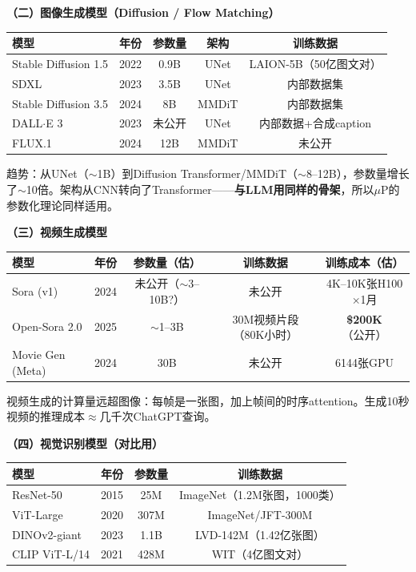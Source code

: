 \documentclass[11pt,a4paper]{article}
\begin{document}
\bigskip
\textbf{（二）图像生成模型（Diffusion / Flow Matching）}

\begin{center}
\renewcommand{\arraystretch}{1.3}
\begin{tabular}{llccc}
\toprule
模型 & 年份 & 参数量 & 架构 & 训练数据 \\
\midrule
Stable Diffusion 1.5 & 2022 & 0.9B & UNet & LAION-5B（50亿图文对）\\
SDXL & 2023 & 3.5B & UNet & 内部数据集 \\
Stable Diffusion 3.5 & 2024 & 8B & MMDiT & 内部数据集 \\
DALL$\cdot$E 3 & 2023 & 未公开 & UNet & 内部数据+合成caption \\
FLUX.1 & 2024 & 12B & MMDiT & 未公开 \\
\bottomrule
\end{tabular}
\end{center}

趋势：从UNet（$\sim$1B）到Diffusion Transformer/MMDiT（$\sim$8--12B），参数量增长了$\sim$10倍。架构从CNN转向了Transformer——\textbf{与LLM用同样的骨架}，所以$\mu$P的参数化理论同样适用。

\bigskip
\textbf{（三）视频生成模型}

\begin{center}
\renewcommand{\arraystretch}{1.3}
\begin{tabular}{llccc}
\toprule
模型 & 年份 & 参数量（估） & 训练数据 & 训练成本（估）\\
\midrule
Sora (v1) & 2024 & 未公开（$\sim$3--10B?） & 未公开 & 4K--10K张H100$\times$1月 \\
Open-Sora 2.0 & 2025 & $\sim$1--3B & 30M视频片段（80K小时） & \textbf{\$200K}（公开） \\
Movie Gen (Meta) & 2024 & 30B & 未公开 & 6144张GPU \\
\bottomrule
\end{tabular}
\end{center}

视频生成的计算量远超图像：每帧是一张图，加上帧间的时序attention。生成10秒视频的推理成本$\approx$几千次ChatGPT查询。

\bigskip
\textbf{（四）视觉识别模型（对比用）}

\begin{center}
\renewcommand{\arraystretch}{1.3}
\begin{tabular}{llcc}
\toprule
模型 & 年份 & 参数量 & 训练数据 \\
\midrule
ResNet-50 & 2015 & 25M & ImageNet（1.2M张图，1000类） \\
ViT-Large & 2020 & 307M & ImageNet/JFT-300M \\
DINOv2-giant & 2023 & 1.1B & LVD-142M（1.42亿张图）\\
CLIP ViT-L/14 & 2021 & 428M & WIT（4亿图文对） \\
\bottomrule
\end{tabular}
\end{center}
\end{document}
